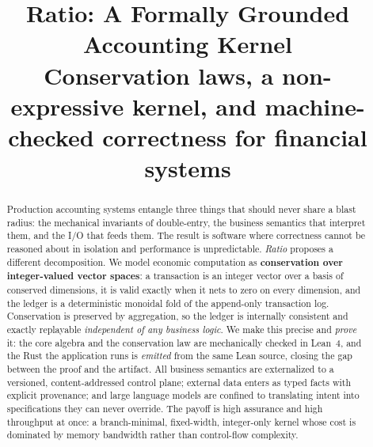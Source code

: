 \documentclass[10pt,letterpaper]{article}
\title{Ratio: A Formally Grounded Accounting Kernel\\
       \large {\normalfont Conservation laws, a non-expressive kernel,
       and machine-checked correctness for financial systems}}
\author{}
\date{}
\theoremstyle{plain}
\theoremstyle{definition}
\begin{document}
\maketitle

\begin{abstract}
Production accounting systems entangle three things that should never
share a blast radius: the mechanical invariants of double-entry, the
business semantics that interpret them, and the I/O that feeds them.
The result is software where correctness cannot be reasoned about in
isolation and performance is unpredictable. \emph{Ratio} proposes a
different decomposition. We model economic computation as
\textbf{conservation over integer-valued vector spaces}: a transaction
is an integer vector over a basis of conserved dimensions, it is valid
exactly when it nets to zero on every dimension, and the ledger is a
deterministic monoidal fold of the append-only transaction log.
Conservation is preserved by aggregation, so the ledger is internally
consistent and exactly replayable \emph{independent of any business
logic}. We make this precise and \emph{prove} it: the core algebra and
the conservation law are mechanically checked in Lean~4, and the Rust
the application runs is \emph{emitted} from the same Lean source, closing
the gap between the proof and the artifact. All business semantics are
externalized to a versioned, content-addressed control plane; external
data enters as typed facts with explicit provenance; and large language
models are confined to translating intent into specifications they can
never override. The payoff is high assurance and high throughput at
once: a branch-minimal, fixed-width, integer-only kernel whose cost is
dominated by memory bandwidth rather than control-flow complexity.
\end{abstract}
\end{document}
